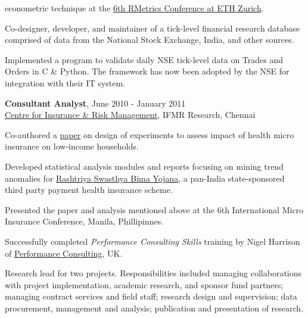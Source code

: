 \documentclass[a4paper,11pt]{article}
\renewenvironment{itemize}{
\begin{list}{}{
  \setlength{\leftmargin}{1.5em}
  }
  }{
\end{list}
}
\begin{document}
{\begin{itemize}
\begin{itemize}
        econometric technique at the
        \href{https://www.rmetrics.org/meielisalp2012}{6th RMetrics Conference
        at ETH Zurich}.
      \item Co-designer, developer, and maintainer of a tick-level
        financial research database comprised of data from the National
        Stock Exchange, India, and other sources.
      \item Implemented a program to validate daily NSE tick-level data on
        Trades and Orders in C \& Python. The framework has now been adopted by
        the NSE for integration with their IT system.
    \end{itemize}
    \vspace*{\baselineskip} %
  \item \textbf{Consultant Analyst}, June 2010 - January 2011 \\
    \href{http://www.cirm.in/} {Centre for Insurance \& Risk Management},
    IFMR Research, Chennai
    \begin{itemize}
      \item Co-authored a
        \href{http://www.munichre-foundation.org/dms/MRS/Documents/Microinsurance/2010_IMC/S11_MIC2010_Presentation_Behl.pdf}{paper}
        on design of experiments to assess impact of health micro insurance on
        low-income households.
      \item Developed statistical analysis modules and reports focusing on
        mining trend anomalies for
        \href{http://www.rsby.gov.in/}{Rashtriya Swasthya Bima Yojana},
        a pan-India state-sponsored third party payment health
        insurance scheme.
      \item Presented the paper and analysis mentioned above at the 6th
        International Micro Insurance Conference, Manila, Phillipinnes.
      \item Successfully completed \emph{Performance Consulting Skills}
        training by Nigel Harrison of
        \href{http://performconsult.co.uk/}{Performance Consulting}, UK.
      \item Research lead for two projects. Responsibilities included managing
        collaborations with project implementation, academic research, and
        sponsor fund partners; managing contract services and field staff;
        research design and supervision; data procurement, management and
        analysis; publication and presentation of research.
    \end{itemize}
\end{itemize}}
\end{document}
